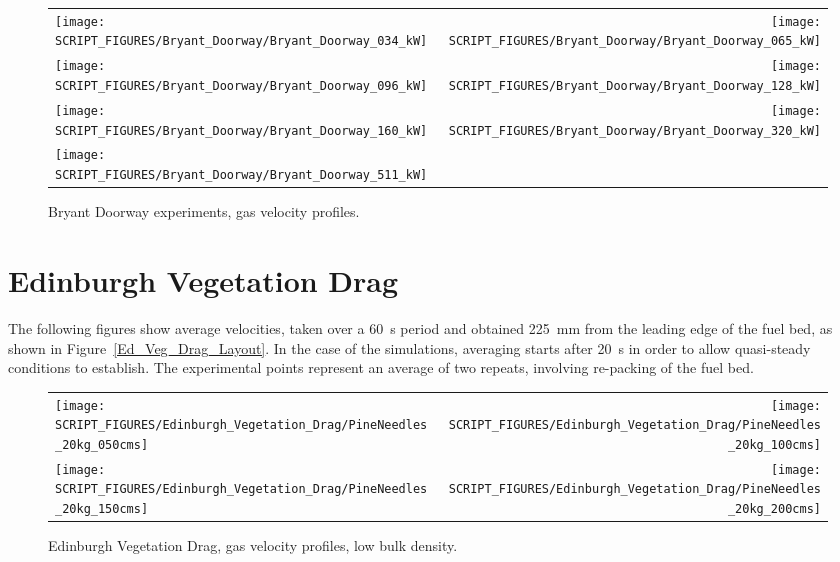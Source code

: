 \newpage

\begin{figure}[p]
\begin{tabular*}{\textwidth}{l@{\extracolsep{\fill}}r}
\texttt{[image: SCRIPT\_FIGURES/Bryant\_Doorway/Bryant\_Doorway\_034\_kW]} &
\texttt{[image: SCRIPT\_FIGURES/Bryant\_Doorway/Bryant\_Doorway\_065\_kW]} \\
\texttt{[image: SCRIPT\_FIGURES/Bryant\_Doorway/Bryant\_Doorway\_096\_kW]} &
\texttt{[image: SCRIPT\_FIGURES/Bryant\_Doorway/Bryant\_Doorway\_128\_kW]} \\
\texttt{[image: SCRIPT\_FIGURES/Bryant\_Doorway/Bryant\_Doorway\_160\_kW]} &
\texttt{[image: SCRIPT\_FIGURES/Bryant\_Doorway/Bryant\_Doorway\_320\_kW]} \\
\texttt{[image: SCRIPT\_FIGURES/Bryant\_Doorway/Bryant\_Doorway\_511\_kW]} &
\end{tabular*}
\caption[Bryant Doorway experiments, gas velocity profiles]{Bryant Doorway experiments, gas velocity profiles.}
\label{Bryant_Doorway}
\end{figure}


\clearpage

\section{Edinburgh Vegetation Drag}

The following figures show average velocities, taken over a 60~s period and obtained 225~mm from the leading edge of the fuel bed, as shown in Figure~\ref{Ed_Veg_Drag_Layout}. In the case of the simulations, averaging starts after 20~s in order to allow quasi-steady conditions to establish. The experimental points represent an average of two repeats, involving re-packing of the fuel bed.

\begin{figure}[ht]
\begin{tabular*}{\textwidth}{l@{\extracolsep{\fill}}r}
\texttt{[image: SCRIPT\_FIGURES/Edinburgh\_Vegetation\_Drag/PineNeedles\_20kg\_050cms]} &
\texttt{[image: SCRIPT\_FIGURES/Edinburgh\_Vegetation\_Drag/PineNeedles\_20kg\_100cms]} \\
\texttt{[image: SCRIPT\_FIGURES/Edinburgh\_Vegetation\_Drag/PineNeedles\_20kg\_150cms]} &
\texttt{[image: SCRIPT\_FIGURES/Edinburgh\_Vegetation\_Drag/PineNeedles\_20kg\_200cms]} \\
\end{tabular*}
\caption[Edinburgh Vegetation Drag, gas velocity profiles, low bulk density]{Edinburgh Vegetation Drag, gas velocity profiles, low bulk density.}
\label{Ed_Veg_Drag_velocity_low}
\end{figure}

